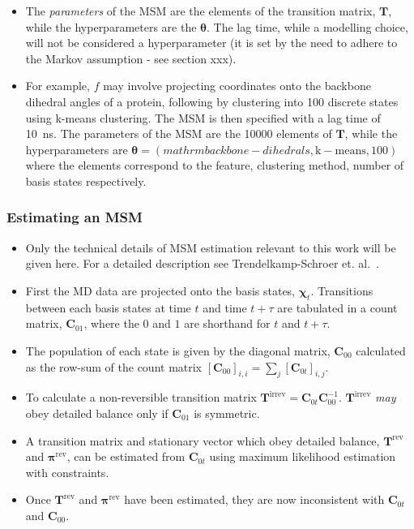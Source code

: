 \documentclass[journal=jacsat,manuscript=article]{achemso}
\begin{document}
\begin{itemize}
    \item The \emph{parameters} of the MSM are the elements of the transition matrix, $\mathbf{T}$, while the hyperparameters are the $\bm{\theta}$. The lag time, while a modelling choice, will not be considered a hyperparameter (it is set by the need to adhere to the Markov assumption - see section xxx). 
    \item For example, $f$ may involve projecting coordinates onto the backbone dihedral angles of a protein, following by clustering into \num{100} discrete states using k-means clustering. The MSM is then specified with a lag time of \SI{10}{\nano\second}. The parameters of the MSM are the \num{10000} elements of $\mathbf{T}$, while the hyperparameters are $\bm{\theta}=(mathrm{backbone-dihedrals}, \mathrm{k-means}, 100)$ where the elements correspond to the feature, clustering method, number of basis states respectively. 
\end{itemize}

\subsubsection{Estimating an MSM}
\begin{itemize}
    \item Only the technical details of MSM estimation relevant to this work will be given here.  For a detailed description see Trendelkamp-Schroer et. al.~\cite{trendelkamp-schroer_estimation_2015}. 
    \item First the MD data are projected onto the basis states, $\bm{\chi}_t$. Transitions between each basis states at time $t$ and time $t + \tau$ are tabulated in a count matrix, $\mathbf{C}_{01}$, where the $0$ and $1$ are shorthand for $t$ and $t+\tau$. 
    \item The population of each state is given by the diagonal matrix, $\mathbf{C}_{00}$ calculated as the row-sum of the count matrix $[\mathbf{C}_{00}]_{i, i} = \sum_j [\mathbf{C}_{0t}]_{i, j}$. 
    \item To calculate a non-reversible transition matrix $\mathbf{T}^{\mathrm{irrev}} = \mathbf{C}_{0t}\mathbf{C}_{00}^{-1}$.  $\mathbf{T}^{\mathrm{irrev}}$ \emph{may} obey detailed balance only if $\mathbf{C}_{01}$ is symmetric. 
    \item A transition matrix and stationary vector which obey detailed balance, $\mathbf{T}^{\mathrm{rev}}$ and $\bm{\pi}^{\mathrm{rev}}$, can be estimated from $\mathbf{C}_{0t}$ using maximum likelihood estimation with constraints. 
    \item Once $\mathbf{T}^{\mathrm{rev}}$ and $\bm{\pi}^{\mathrm{rev}}$ have been estimated, they are now inconsistent with $\mathbf{C}_{0t}$ and $\mathbf{C}_{00}$. 
\end{itemize}
\end{document}
